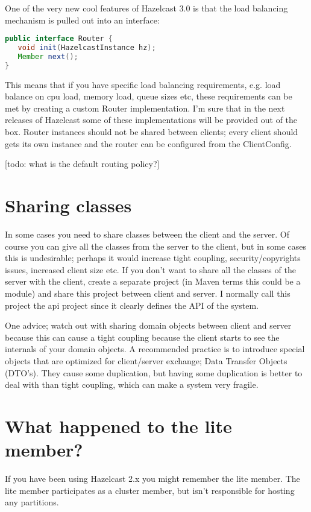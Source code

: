 One of the very new cool features of Hazelcast 3.0 is that the load balancing mechanism is pulled out into an interface:
\begin{lstlisting}[language=java]
public interface Router {
   void init(HazelcastInstance hz);
   Member next();
}
\end{lstlisting}
This means that if you have specific load balancing requirements, e.g. load balance on cpu load, memory load, queue sizes etc, these requirements can be met by creating a custom Router implementation. I'm sure that in the next releases of Hazelcast some of these implementations will be provided out of the box. Router instances should not be shared between clients; every client should gets its own instance and the router can be configured from the ClientConfig.

[todo: what is the default routing policy?]

\section{Sharing classes}
In some cases you need to share classes between the client and the server. Of course you can give all the classes from the server to the client, but in some cases this is undesirable; perhaps it would increase tight coupling, security/copyrights issues, increased client size etc. If you don't want to share all the classes of the server with the client, create a separate project (in Maven terms this could be a module) and share this project between client and server. I normally call this project the api project since it clearly defines the API of the system. 

One advice; watch out with sharing domain objects between client and server because this can cause a tight coupling because the client starts to see the internals of your domain objects. A recommended practice is to introduce special objects that are optimized for client/server exchange; Data Transfer Objects (DTO's). They cause some duplication, but having some duplication is better to deal with than tight coupling, which can make a system very fragile.

\section{What happened to the lite member?}
If you have been using Hazelcast 2.x you might remember the lite member. The lite member participates as a cluster member, but isn't responsible for hosting any partitions. 


